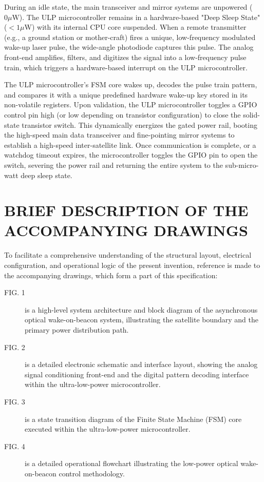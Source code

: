 \documentclass[12pt,a4paper]{article}
\begin{document}
During an idle state, the main transceiver and mirror systems are unpowered ($0\mu\text{W}$). The ULP microcontroller remains in a hardware-based "Deep Sleep State" ($<1\mu\text{W}$) with its internal CPU core suspended. When a remote transmitter (e.g., a ground station or mother-craft) fires a unique, low-frequency modulated wake-up laser pulse, the wide-angle photodiode captures this pulse. The analog front-end amplifies, filters, and digitizes the signal into a low-frequency pulse train, which triggers a hardware-based interrupt on the ULP microcontroller. 

The ULP microcontroller's FSM core wakes up, decodes the pulse train pattern, and compares it with a unique predefined hardware wake-up key stored in its non-volatile registers. Upon validation, the ULP microcontroller toggles a GPIO control pin high (or low depending on transistor configuration) to close the solid-state transistor switch. This dynamically energizes the gated power rail, booting the high-speed main data transceiver and fine-pointing mirror systems to establish a high-speed inter-satellite link. Once communication is complete, or a watchdog timeout expires, the microcontroller toggles the GPIO pin to open the switch, severing the power rail and returning the entire system to the sub-micro-watt deep sleep state.

\section*{BRIEF DESCRIPTION OF THE ACCOMPANYING DRAWINGS}
To facilitate a comprehensive understanding of the structural layout, electrical configuration, and operational logic of the present invention, reference is made to the accompanying drawings, which form a part of this specification:

\begin{description}
    \item[FIG. 1] is a high-level system architecture and block diagram of the asynchronous optical wake-on-beacon system, illustrating the satellite boundary and the primary power distribution path.
    \item[FIG. 2] is a detailed electronic schematic and interface layout, showing the analog signal conditioning front-end and the digital pattern decoding interface within the ultra-low-power microcontroller.
    \item[FIG. 3] is a state transition diagram of the Finite State Machine (FSM) core executed within the ultra-low-power microcontroller.
    \item[FIG. 4] is a detailed operational flowchart illustrating the low-power optical wake-on-beacon control methodology.
\end{description}
\end{document}

